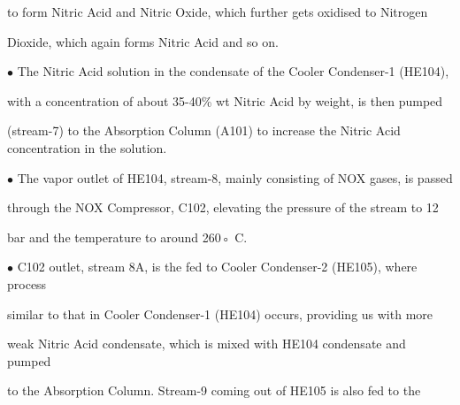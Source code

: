 \documentclass[a4paper,portrait,12pt]{article}
\begin{document}
\begin{flushleft}
to form Nitric Acid and Nitric Oxide, which further gets oxidised to Nitrogen
\end{flushleft}


\begin{flushleft}
Dioxide, which again forms Nitric Acid and so on.
\end{flushleft}


\begin{flushleft}
$\bullet$ The Nitric Acid solution in the condensate of the Cooler Condenser-1 (HE104),
\end{flushleft}


\begin{flushleft}
with a concentration of about 35-40\% wt Nitric Acid by weight, is then pumped
\end{flushleft}


\begin{flushleft}
(stream-7) to the Absorption Column (A101) to increase the Nitric Acid concentration in the solution.
\end{flushleft}


\begin{flushleft}
$\bullet$ The vapor outlet of HE104, stream-8, mainly consisting of NOX gases, is passed
\end{flushleft}


\begin{flushleft}
through the NOX Compressor, C102, elevating the pressure of the stream to 12
\end{flushleft}


\begin{flushleft}
bar and the temperature to around 260◦ C.
\end{flushleft}


\begin{flushleft}
$\bullet$ C102 outlet, stream 8A, is the fed to Cooler Condenser-2 (HE105), where process
\end{flushleft}


\begin{flushleft}
similar to that in Cooler Condenser-1 (HE104) occurs, providing us with more
\end{flushleft}


\begin{flushleft}
weak Nitric Acid condensate, which is mixed with HE104 condensate and pumped
\end{flushleft}


\begin{flushleft}
to the Absorption Column. Stream-9 coming out of HE105 is also fed to the
\end{flushleft}
\end{document}
